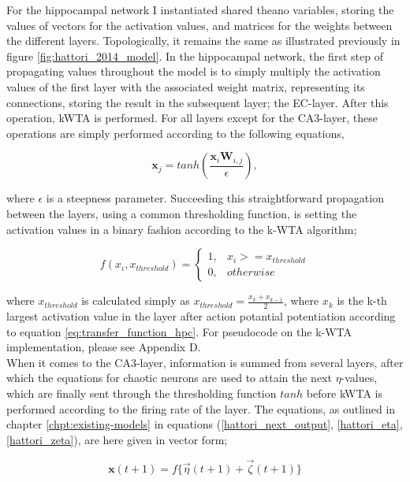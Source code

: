 For the hippocampal network I instantiated shared theano variables, storing the values of vectors for the activation values, and matrices for the weights between the different layers. Topologically, it remains the same as illustrated previously in figure \ref{fig:hattori_2014_model}. In the hippocampal network, the first step of propagating values throughout the model is to simply multiply the activation values of the first layer with the associated weight matrix, representing its connections, storing the result in the subsequent layer; the EC-layer. After this operation, kWTA is performed. For all layers except for the CA3-layer, these operations are simply performed according to the following equations,

\begin{equation}\label{eq:transfer_function_hpc}
    \textbf{x}_j = tanh (\frac{\textbf{x}_i \textbf{W}_{i,j}}{\epsilon}),
\end{equation}

where $\epsilon$ is a steepness parameter. Succeeding this straightforward propagation between the layers, using a common thresholding function, is setting the activation values in a binary fashion according to the k-WTA algorithm;

\begin{equation}
    f(x_i, x_{threshold}) = \begin{cases}
    1, & x_i >= x_{threshold} \\
    0, & otherwise
    \end{cases}
\end{equation}

where $x_{threshold}$ is calculated simply as $x_{threshold} = \frac{x_{k} + x_{k-1}}{2}$, where $x_k$ is the k-th largest activation value in the layer after action potantial potentiation according to equation \ref{eq:transfer_function_hpc}. For pseudocode on the k-WTA implementation, please see Appendix D.
\\

When it comes to the CA3-layer, information is summed from several layers, after which the equations for chaotic neurons are used to attain the next $\eta$-values, which are finally sent through the thresholding function $tanh$ before kWTA is performed according to the firing rate of the layer. The equations, as outlined in chapter \ref{chpt:existing-models} in equations (\ref{hattori_next_output}, \ref{hattori_eta}, \ref{hattori_zeta}), are here given in vector form;

\begin{equation}\label{eq:eta_zeta_sum}
    \textbf{x}(t+1) = f\{ \vec{\eta}(t+1) + \vec{\zeta}(t+1) \}
\end{equation}

